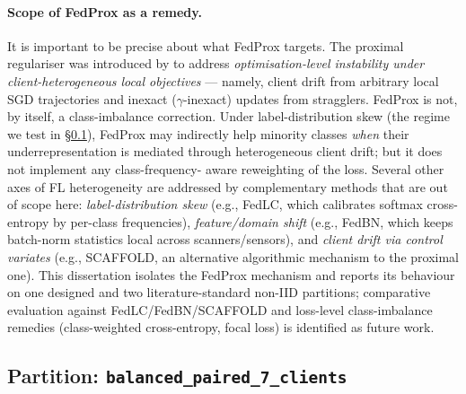 \documentclass[11pt,a4paper]{article}
\begin{document}
\paragraph{Scope of FedProx as a remedy.}
It is important to be precise about what FedProx targets. The proximal
regulariser was introduced by \citet{li2020fedprox} to address
\emph{optimisation-level instability under client-heterogeneous local
objectives} --- namely, client drift from arbitrary local SGD trajectories
and inexact ($\gamma$-inexact) updates from stragglers. FedProx is not, by
itself, a class-imbalance correction. Under label-distribution skew (the
regime we test in §\ref{sec:partition}), FedProx may indirectly help
minority classes \emph{when} their underrepresentation is mediated through
heterogeneous client drift; but it does not implement any class-frequency-
aware reweighting of the loss. Several other axes of FL heterogeneity are
addressed by complementary methods that are out of scope here:
\textit{label-distribution skew} (e.g., FedLC, which calibrates softmax
cross-entropy by per-class frequencies),
\textit{feature/domain shift} (e.g., FedBN, which keeps batch-norm
statistics local across scanners/sensors), and
\textit{client drift via control variates} (e.g., SCAFFOLD, an alternative
algorithmic mechanism to the proximal one).
This dissertation isolates the FedProx mechanism and reports its behaviour
on one designed and two literature-standard non-IID partitions; comparative
evaluation against FedLC/FedBN/SCAFFOLD and loss-level class-imbalance
remedies (class-weighted cross-entropy, focal loss) is identified as future
work.

\subsection{Partition: \texttt{balanced\_paired\_7\_clients}}\label{sec:partition}
\end{document}
